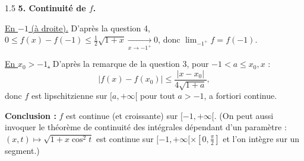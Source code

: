 \documentclass[12pt]{article}
\begin{document}
\begin{spacing}{1.5}
\textbf{5. Continuité de $f$.}

\underline{En $-1$ (à droite).} D'après la question 4, $0\le f(x)-f(-1)\le\frac12\sqrt{1+x}\xrightarrow[x\to-1^+]{}0$, donc $\lim_{-1^+}f=f(-1)$.

\underline{En $x_0>-1$.} D'après la remarque de la question 3, pour $-1<a\le x_0,x$ :
\[
|f(x)-f(x_0)|\le\frac{|x-x_0|}{4\sqrt{1+a}},
\]
donc $f$ est lipschitzienne sur $[a,+\infty[$ pour tout $a>-1$, a fortiori continue.

\textbf{Conclusion :} $f$ est continue (et croissante) sur $[-1,+\infty[$. (On peut aussi invoquer le théorème de continuité des intégrales dépendant d'un paramètre : $(x,t)\mapsto\sqrt{1+x\cos^2t}$ est continue sur $[-1,+\infty[\times[0,\frac\pi2]$ et l'on intègre sur un segment.)

\end{spacing}
\end{document}
